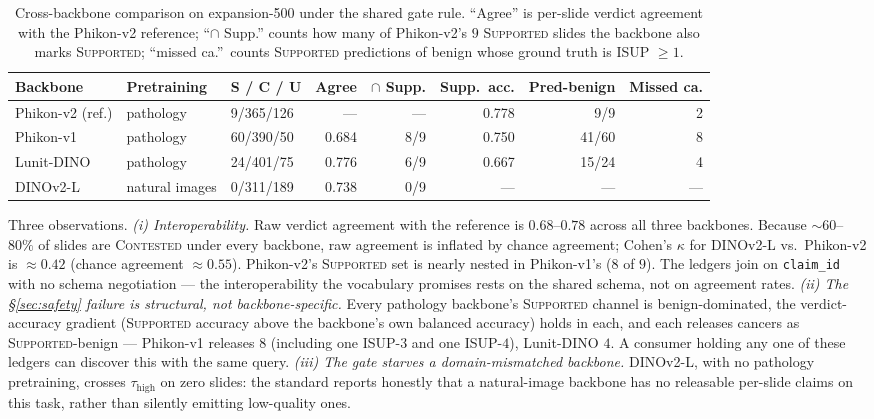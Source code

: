 \documentclass{article}
\newcommand{\SafeNum}[1]{#1}
\begin{document}
\begin{table}[h]
\centering
\caption{Cross-backbone comparison on expansion-500 under the shared gate rule. ``Agree'' is per-slide verdict agreement with the Phikon-v2 reference; ``$\cap$ Supp.'' counts how many of Phikon-v2's $\SafeNum{9}$ \textsc{Supported} slides the backbone also marks \textsc{Supported}; ``missed ca.''\ counts \textsc{Supported} predictions of benign whose ground truth is ISUP $\ge \SafeNum{1}$.}
\label{tab:cross-backbone}
\setlength{\tabcolsep}{4pt}
\small
\begin{tabular}{@{}lllrrrrr@{}}
\toprule
Backbone & Pretraining & S / C / U & Agree & $\cap$ Supp. & Supp.\ acc. & Pred-benign & Missed ca.\\
\midrule
Phikon-v2 (ref.) & pathology & \SafeNum{9}/\SafeNum{365}/\SafeNum{126} & --- & --- & \SafeNum{0.778} & \SafeNum{9}/\SafeNum{9} & \SafeNum{2} \\
Phikon-v1 & pathology & \SafeNum{60}/\SafeNum{390}/\SafeNum{50} & \SafeNum{0.684} & \SafeNum{8}/\SafeNum{9} & \SafeNum{0.750} & \SafeNum{41}/\SafeNum{60} & \SafeNum{8} \\
Lunit-DINO & pathology & \SafeNum{24}/\SafeNum{401}/\SafeNum{75} & \SafeNum{0.776} & \SafeNum{6}/\SafeNum{9} & \SafeNum{0.667} & \SafeNum{15}/\SafeNum{24} & \SafeNum{4} \\
DINOv2-L & natural images & \SafeNum{0}/\SafeNum{311}/\SafeNum{189} & \SafeNum{0.738} & \SafeNum{0}/\SafeNum{9} & --- & --- & --- \\
\bottomrule
\end{tabular}
\end{table}

Three observations. \emph{(i) Interoperability.} Raw verdict agreement with the reference is $\SafeNum{0.68}$--$\SafeNum{0.78}$ across all three backbones. Because $\sim\SafeNum{60}$--$\SafeNum{80}\%$ of slides are \textsc{Contested} under every backbone, raw agreement is inflated by chance agreement; Cohen's $\kappa$ for DINOv2-L vs.\ Phikon-v2 is $\approx\SafeNum{0.42}$ (chance agreement $\approx\SafeNum{0.55}$). Phikon-v2's \textsc{Supported} set is nearly nested in Phikon-v1's ($\SafeNum{8}$ of $\SafeNum{9}$). The ledgers join on \texttt{claim\_id} with no schema negotiation --- the interoperability the vocabulary promises rests on the shared schema, not on agreement rates. \emph{(ii) The \S\ref{sec:safety} failure is structural, not backbone-specific.} Every pathology backbone's \textsc{Supported} channel is benign-dominated, the verdict-accuracy gradient (\textsc{Supported} accuracy above the backbone's own balanced accuracy) holds in each, and each releases cancers as \textsc{Supported}-benign --- Phikon-v1 releases $\SafeNum{8}$ (including one ISUP-$\SafeNum{3}$ and one ISUP-$\SafeNum{4}$), Lunit-DINO $\SafeNum{4}$. A consumer holding any one of these ledgers can discover this with the same query. \emph{(iii) The gate starves a domain-mismatched backbone.} DINOv2-L, with no pathology pretraining, crosses $\tau_{\text{high}}$ on zero slides: the standard reports honestly that a natural-image backbone has no releasable per-slide claims on this task, rather than silently emitting low-quality ones.
\end{document}
